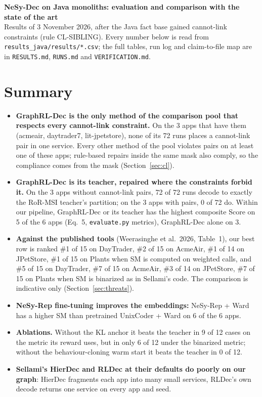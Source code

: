 \documentclass[10pt,a4paper]{article}
\begin{document}
{\Large\bfseries NeSy-Dec on Java monoliths: evaluation and comparison with the state of the art}\\[0.4em]
{\small Results of 3 November 2026, after the Java fact base gained cannot-link constraints (rule CL-SIBLING). Every number below is read from \texttt{results\_java/results/*.csv}; the full tables, run log and claim-to-file map are in \texttt{RESULTS.md}, \texttt{RUNS.md} and \texttt{VERIFICATION.md}.}
\section{Summary}
\begin{itemize}\setlength{\itemsep}{2pt}
\item \textbf{GraphRL-Dec is the only method of the comparison pool that respects every cannot-link constraint.} On the 3 apps that have them (acmeair, daytrader7, lit-jpetstore), none of its 72 runs places a cannot-link pair in one service. Every other method of the pool violates pairs on at least one of these apps; rule-based repairs inside the same mask also comply, so the compliance comes from the mask (Section~\ref{sec:cl}).
\item \textbf{GraphRL-Dec is its teacher, repaired where the constraints forbid it.} On the 3 apps without cannot-link pairs, 72 of 72 runs decode to exactly the RoR-MSI teacher's partition; on the 3 apps with pairs, 0 of 72 do. Within our pipeline, GraphRL-Dec or its teacher has the highest composite Score on 5 of the 6 apps (Eq.~5, \texttt{evaluate.py} metrics), GraphRL-Dec alone on 3.
\item \textbf{Against the published tools} (Weerasinghe et al.\ 2026, Table~1), our best row is ranked \#1 of 15 on DayTrader, \#2 of 15 on AcmeAir, \#1 of 14 on JPetStore, \#1 of 15 on Plants when SM is computed on weighted calls, and \#5 of 15 on DayTrader, \#7 of 15 on AcmeAir, \#3 of 14 on JPetStore, \#7 of 15 on Plants when SM is binarized as in Sellami's code. The comparison is indicative only (Section~\ref{sec:threats}).
\item \textbf{NeSy-Rep fine-tuning improves the embeddings:} NeSy-Rep + Ward has a higher SM than pretrained UnixCoder + Ward on 6 of the 6 apps.
\item \textbf{Ablations.} Without the KL anchor it beats the teacher in 9 of 12 cases on the metric its reward uses, but in only 6 of 12 under the binarized metric; without the behaviour-cloning warm start it beats the teacher in 0 of 12.
\item \textbf{Sellami's HierDec and RLDec at their defaults do poorly on our graph}: HierDec fragments each app into many small services, RLDec's own decode returns one service on every app and seed.

\end{itemize}
\end{document}
